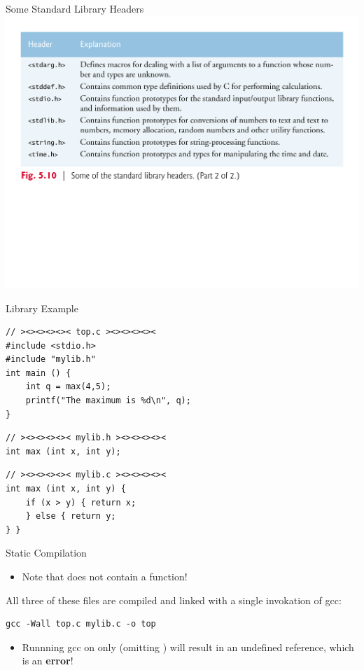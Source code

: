 \documentclass[11pt]{beamer}
\let\OldTexttt\texttt
\renewcommand{\texttt}[1]{\OldTexttt{\color{teal}{#1}}}
\begin{document}
\begin{frame}{Some Standard Library Headers}
\center
\includegraphics[scale=0.33]{headers2.png}
\end{frame}

\begin{frame}[fragile=singleslide]{Library Example} 
\begin{lstlisting}[style = C] 
// ><><><><>< top.c ><><><><><
#include <stdio.h>
#include "mylib.h"
int main () {
	int q = max(4,5);
	printf("The maximum is %d\n", q);
}
\end{lstlisting}
\begin{lstlisting}[style = C] 
// ><><><><>< mylib.h ><><><><><
int max (int x, int y);
\end{lstlisting}
\begin{lstlisting}[style = C]
// ><><><><>< mylib.c ><><><><><
int max (int x, int y) {
	if (x > y) { return x;
	} else { return y;
} }
\end{lstlisting}
\end{frame}

\begin{frame}[fragile=singleslide]{Static Compilation}
\begin{itemize}
\item Note that \texttt{lib.c} does not contain a \texttt{main} function!
\end{itemize}
All three of these files are compiled and linked with a single invokation of gcc:
\begin{lstlisting}[style=terminal]
gcc -Wall top.c mylib.c -o top
\end{lstlisting}
\begin{itemize}
\item Runnning gcc on only \texttt{top.c} (omitting \texttt{mylib.c}) will result in an undefined reference, which is an \textbf{error}! 
\end{itemize}
\end{frame}
\end{document}
